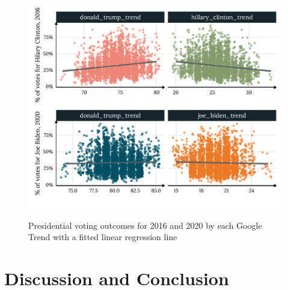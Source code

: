 \begin{figure}[h]
{\centering \includegraphics[width=0.8\linewidth]{figs/paper1/pres_plot-1.pdf}}
\caption{Presidential voting outcomes for 2016 and 2020 by each Google Trend with a fitted linear regression line}\label{fig:pres_plot-1}
\end{figure}




\section{Discussion and Conclusion}






